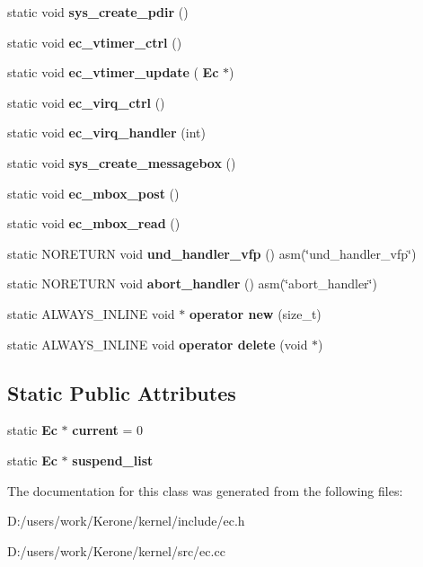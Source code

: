 \begin{DoxyCompactItemize}
static void {\bfseries sys\+\_\+create\+\_\+pdir} ()
\item 
\mbox{\label{class_ec_aaff77ae9bf5ee5a1ce0c5e1830d72f38}} 
static void {\bfseries ec\+\_\+vtimer\+\_\+ctrl} ()
\item 
\mbox{\label{class_ec_a89b9a88b0b1c3e4e38711f1ae0b7479d}} 
static void {\bfseries ec\+\_\+vtimer\+\_\+update} (\textbf{ Ec} $\ast$)
\item 
\mbox{\label{class_ec_a7bede45f90a7065ca192cce782bb23e5}} 
static void {\bfseries ec\+\_\+virq\+\_\+ctrl} ()
\item 
\mbox{\label{class_ec_a768933aae897dab87da365c04897087f}} 
static void {\bfseries ec\+\_\+virq\+\_\+handler} (int)
\item 
\mbox{\label{class_ec_aabaec9affa979236fc98d2994199847a}} 
static void {\bfseries sys\+\_\+create\+\_\+messagebox} ()
\item 
\mbox{\label{class_ec_af6ac7bcf718cf188e00b158cd6f33f1a}} 
static void {\bfseries ec\+\_\+mbox\+\_\+post} ()
\item 
\mbox{\label{class_ec_ae4c8a1bccc4b715d616347f5b428c71b}} 
static void {\bfseries ec\+\_\+mbox\+\_\+read} ()
\item 
\mbox{\label{class_ec_ac22bcb0ab5c69d5ef490e811e933bde7}} 
static N\+O\+R\+E\+T\+U\+RN void {\bfseries und\+\_\+handler\+\_\+vfp} () asm(\char`\"{}und\+\_\+handler\+\_\+vfp\char`\"{})
\item 
\mbox{\label{class_ec_a975573d340a190eeeefd0cb19ceda995}} 
static N\+O\+R\+E\+T\+U\+RN void {\bfseries abort\+\_\+handler} () asm(\char`\"{}abort\+\_\+handler\char`\"{})
\item 
\mbox{\label{class_ec_aa04b647bb64ef769ba0cdc56ba3c96e4}} 
static A\+L\+W\+A\+Y\+S\+\_\+\+I\+N\+L\+I\+NE void $\ast$ {\bfseries operator new} (size\+\_\+t)
\item 
\mbox{\label{class_ec_a63735ba58492ca396c89582d9889d178}} 
static A\+L\+W\+A\+Y\+S\+\_\+\+I\+N\+L\+I\+NE void {\bfseries operator delete} (void $\ast$)
\end{DoxyCompactItemize}
\subsection*{Static Public Attributes}
\begin{DoxyCompactItemize}
\item 
\mbox{\label{class_ec_a47e7dc3ee3e8819589c4bc7050db6cf3}} 
static \textbf{ Ec} $\ast$ {\bfseries current} = 0
\item 
\mbox{\label{class_ec_a0c2c968b59f59a562799a46fef233d2b}} 
static \textbf{ Ec} $\ast$ {\bfseries suspend\+\_\+list}
\end{DoxyCompactItemize}


The documentation for this class was generated from the following files\+:\begin{DoxyCompactItemize}
\item 
D\+:/users/work/\+Kerone/kernel/include/ec.\+h\item 
D\+:/users/work/\+Kerone/kernel/src/ec.\+cc\end{DoxyCompactItemize}
